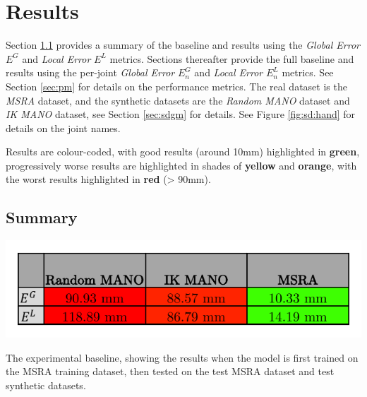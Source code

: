 \chapter{Results}
\label{chap:res}
Section \ref{ap:sum} provides a summary of the baseline and results using the {\slshape Global Error} $E^G$ and {\slshape Local Error} $E^L$ metrics. Sections thereafter provide the full baseline and results using the per-joint {\slshape Global Error} $E^G_n$ and {\slshape Local Error} $E^L_n$ metrics. See Section \ref{sec:pm} for details on the performance metrics. The real dataset is the {\slshape MSRA} dataset, and the synthetic datasets are the {\slshape Random MANO} dataset and {\slshape IK MANO} dataset, see Section \ref{sec:sdgm} for details. See Figure \ref{fig:sd:hand} for details on the joint names.


Results are colour-coded, with good results (around 10mm) highlighted in {\bfseries\colorbox{dd_green}{green}}, progressively worse results are highlighted in shades of {\bfseries\colorbox{dd_yellow}{yellow}} and {\bfseries\colorbox{dd_yelloworange}{orange}}, with the worst results highlighted in {\bfseries\colorbox{dd_red}{red}} (> 90mm).
\FloatBarrier\section{Summary}
\label{ap:sum}

\begin{table}[!ht]
    \centering
    \includegraphics[width=0.7\linewidth]{figs/general/baseline.pdf}
    \caption{The experimental baseline, showing the results when the model is first trained on the MSRA training dataset, then tested on the test MSRA dataset and test synthetic datasets.}
    \end{table}

